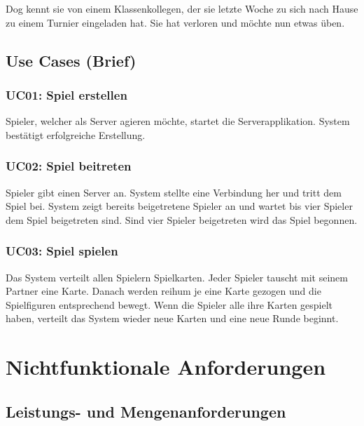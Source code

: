 \documentclass[a4paper,12pt,halfparskip,DIV14]{scrartcl}
\begin{document}
Dog kennt sie von einem Klassenkollegen, der sie letzte Woche zu sich nach Hause zu einem Turnier eingeladen hat. Sie hat verloren und möchte nun etwas üben.

\subsection{Use Cases (Brief)}\label{sec:use_cases_brief_} %
\subsubsection{UC01: Spiel erstellen}\label{sub:uc01_spiel_erstellen} %
Spieler, welcher als Server agieren möchte, startet die Serverapplikation. System bestätigt erfolgreiche Erstellung.

\subsubsection{UC02: Spiel beitreten}\label{sub:uc02_spiel_beitreten} %
Spieler gibt einen Server an. System stellte eine Verbindung her und tritt dem Spiel bei. System zeigt bereits beigetretene Spieler an und wartet bis vier Spieler dem Spiel beigetreten sind. Sind vier Spieler beigetreten wird das Spiel begonnen.

\subsubsection{UC03: Spiel spielen}\label{sub:uc03_spiel_spielen} %
Das System verteilt allen Spielern Spielkarten. Jeder Spieler tauscht mit seinem Partner eine Karte. Danach werden reihum je eine Karte gezogen und die Spielfiguren entsprechend bewegt. Wenn die Spieler alle ihre Karten gespielt haben, verteilt das System wieder neue Karten und eine neue Runde beginnt. 

\section{Nichtfunktionale Anforderungen}\label{cha:nichtfunktionale_anforderungen} %

\subsection{Leistungs- und Mengenanforderungen}\label{sub:leistungs_und_mengenanforderungen} %
\end{document}
